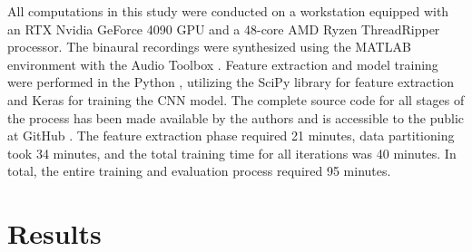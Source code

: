 \documentclass{article}
\begin{document}
All computations in this study were conducted on a workstation equipped with an RTX Nvidia GeForce 4090 GPU and a 48-core AMD Ryzen ThreadRipper processor. The binaural recordings were synthesized using the MATLAB \parencite{MATLAB} environment with the Audio Toolbox \parencite{MATLAB_Audio_Toolbox}. Feature extraction and model training were performed in the Python \parencite{python}, utilizing the SciPy \parencite{2020SciPy-NMeth} library for feature extraction and Keras for training the CNN model. The complete source code for all stages of the process has been made available by the authors and is accessible to the public at GitHub \parencite{github_repo}. The feature extraction phase required 21 minutes, data partitioning took 34 minutes, and the total training time for all iterations was 40 minutes. In total, the entire training and evaluation process required 95 minutes.

\section{Results}
\label{sec:results}
\end{document}
